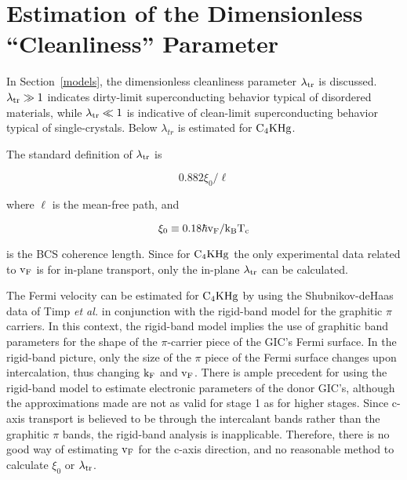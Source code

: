 \chapter[Est\-imation of the Di\-men\-sion\-less Pa\-ram\-eter $\rm \lambda_{tr}$]{Estimation of the Di\-men\-sion\-less ``Clean\-li\-ness'' Pa\-ram\-eter}
\label{lambda_tr}
\pagestyle{headings}

        In Section~\ref{models},   the dimensionless  cleanliness parameter
$\rm
\lambda_{tr}$ is discussed.  $\rm \lambda_{tr} \gg 1$ indicates dirty-limit
superconducting behavior typical    of  disordered materials,   while  $\rm
\lambda_{tr} \ll 1$ is  indicative of clean-limit superconducting  behavior
typical  of single-crystals.  Below  $\lambda_{tr}$ is estimated   for $\rm
C_4KHg$.

        The standard definition of  $\rm \lambda_{tr}$ is\cite{orlando79}

\[ 0.882  \xi_0 / \ell \]

\noindent  where $\ell$ is the mean-free path, and

\[ \rm \xi_0 \equiv    0.18   \hbar  v_F  /   k_B   T_c   \]

\noindent is     the    BCS coherence
length.\cite{tinkham80}  Since for  $\rm C_4KHg$ the only experimental data
related to $\rm v_F$ is for in-plane transport, only the in-plane $\rm
\lambda_{tr}$ can be calculated.

        The Fermi velocity can be  estimated for $\rm  C_4KHg$ by using the
Shubnikov-deHaas data of Timp {\em et al.\/}\cite{W179} in conjunction with
the rigid-band  model for  the  graphitic $\pi$ carriers.  In this context,
the rigid-band model implies the use of graphitic band parameters for the shape of
the $\pi$-carrier  piece of the GIC's  Fermi  surface.   In  the rigid-band
picture, only the size of the $\pi$ piece of the Fermi surface changes 
upon intercalation, thus changing $\rm k_F$ and $\rm v_F$.  There
is   ample   precedent for  using   the     rigid-band  model to estimate
electronic parameters of the   donor
GIC's,\cite{W179,Z260}  although the  approximations  made are not as valid
for stage 1 as for higher stages.  Since c-axis transport is believed to be
through   the    intercalant    bands      rather   than   the graphitic  $\pi$
bands,\cite{M143,E343} the rigid-band analysis is inapplicable.  Therefore,
there is no good way of estimating $\rm v_F$  for the c-axis direction, and
no reasonable method to calculate $\xi_0$ or $\rm \lambda_{tr}$.

